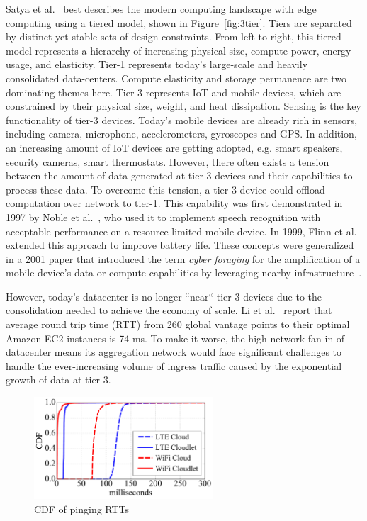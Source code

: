 Satya et al.~\cite{satya2019computing} best describes the modern computing
landscape with edge computing using a tiered model, shown in
Figure~\ref{fig:3tier}. Tiers are separated by distinct yet stable sets of
design constraints. From left to right, this tiered model represents a hierarchy
of increasing physical size, compute power, energy usage, and elasticity. Tier-1
represents today's large-scale and heavily consolidated data-centers. Compute
elasticity and storage permanence are two dominating themes here. Tier-3
represents IoT and mobile devices, which are constrained by their physical size,
weight, and heat dissipation. Sensing is the key functionality of tier-3
devices. Today's mobile devices are already rich in sensors, including camera,
microphone, accelerometers, gyroscopes and GPS. In addition, an increasing
amount of IoT devices are getting adopted, e.g. smart speakers, security
cameras, smart thermostats. However, there often exists a tension between the
amount of data generated at tier-3 devices and their capabilities to process
these data. To overcome this tension, a tier-3 device could offload computation
over network to tier-1. This capability was first demonstrated in 1997 by Noble
et al.~\cite{Noble1997}, who used it to implement speech recognition with
acceptable performance on a resource-limited mobile device. In 1999, Flinn et
al.~\cite{Flinn1999} extended this approach to improve battery life.  These
concepts were generalized in a 2001 paper that introduced the term {\em cyber
foraging} for the amplification of a mobile device's data or compute
capabilities by leveraging nearby infrastructure~\cite{Satya2001}.  

However, today's datacenter is no longer ``near`` tier-3 devices due to
the consolidation needed to achieve the economy of scale. Li et
al.~\cite{li2010cloudcmp} report that average round trip time (RTT) from 260
global vantage points to their optimal Amazon EC2 instances is 74 ms. To make it
worse, the high network fan-in of datacenter means its aggregation network would
face significant challenges to handle the ever-increasing volume of ingress
traffic caused by the exponential growth of data at tier-3. 

\begin{figure}
\centering
\includegraphics[height=1.5in]{FIGS/ping_cdf.pdf}
\caption{CDF of pinging RTTs}\label{fig:ping-CDF}
\end{figure}

